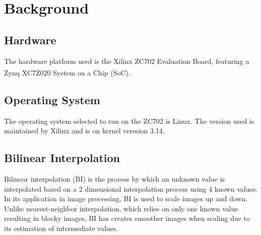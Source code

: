 
\chapter{Background}

\section{Hardware}
The hardware platform used is the Xilinx ZC702 Evaluation Board, featuring a Zynq\textsuperscript{\textregistered} XC7Z020 System on a Chip (SoC).

\section{Operating System}
The operating system selected to run on the ZC702 is Linux.  The version used is maintained by Xilinx and is on kernel veresion 3.14.

\section{Bilinear Interpolation}
Bilinear interpolation (BI) is the process by which an unknown value is interpolated based on a 2 dimensional interpolation process using 4 known values.  In its application in image processing, BI is used to scale images up and down.  Unlike nearest-neighbor interpolation, which relies on only one known value resulting in blocky images, BI has creates smoother images when scaling due to its estimation of intermediate values.

